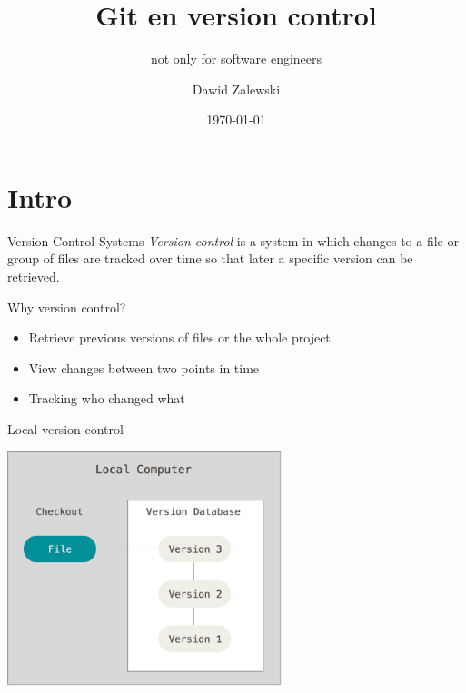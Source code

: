 \documentclass[
  11pt,
  american,
  ignorenonframetext,
  aspectratio=43,
  compress,
  xcolor=dvipsnames]{beamer}
\title{Git en version control}
\subtitle{not only for software engineers}
\author{Dawid Zalewski}
\date{\today{}}
\providecommand{\tightlist}{%
  \setlength{\itemsep}{0pt}\setlength{\parskip}{0pt}}
\begin{document}
	
	
\frame{\titlepage}

\hypertarget{intro}{%
\section{Intro}\label{intro}}

\begin{frame}{Version Control Systems}
\protect\hypertarget{version-control-systems}{}
\emph{Version control} is a system in which changes to a file or group
of files are tracked over time so that later a specific version can be
retrieved.
\end{frame}

\begin{frame}{Why version control?}
\protect\hypertarget{why-version-control}{}
\begin{itemize}
\tightlist
\item
  Retrieve previous versions of files or the whole project
\item
  View changes between two points in time
\item
  Tracking who changed what
\end{itemize}
\end{frame}

\begin{frame}{Local version control}
\protect\hypertarget{local-version-control}{}
\begin{center}
\includegraphics[width=0.6\textwidth]{./images/local.png}
\end{center}
\end{frame}
\end{document}
